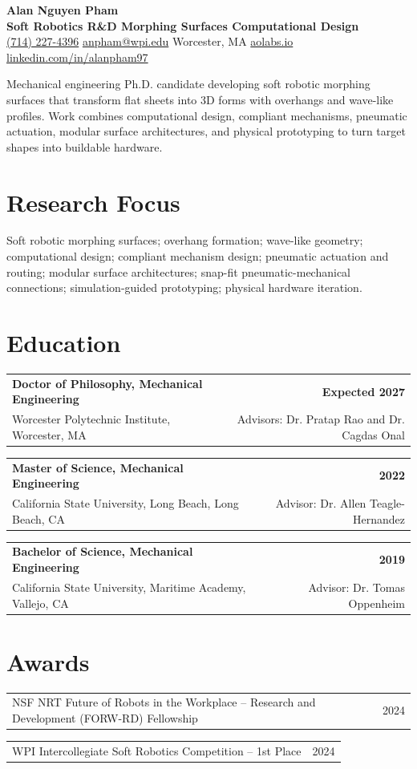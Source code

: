 \documentclass[10pt,letterpaper]{article}
\makeatletter
\newcommand{\contactsep}{\quad\textcolor{muted}{\textbullet}\quad}
\newcommand{\profilebox}[1]{%
  \vspace{5pt}
  {\setlength{\fboxsep}{8pt}\colorbox{peach}{\parbox{\dimexpr\linewidth-2\fboxsep\relax}{#1}}}
  \vspace{1pt}
}
\newcommand{\degreeentry}[4]{%
  \begin{tabularx}{\textwidth}{@{}>{\raggedright\arraybackslash}X r@{}}
    \textbf{#1} & \textbf{#2}\\
    #3 & #4
  \end{tabularx}
  \vspace{0.25pt}
}
\newcommand{\datedline}[2]{%
  \begin{tabularx}{\textwidth}{@{}>{\raggedright\arraybackslash}X r@{}}
    #1 & #2
  \end{tabularx}
}
\makeatother
\begin{document}
\RaggedRight

{\fontsize{22}{25}\selectfont\textbf{Alan Nguyen Pham}}\\[-1pt]
{\large\textbf{\textcolor{accent}{Soft Robotics R\&D \textbar{} Morphing Surfaces \textbar{} Computational Design}}}\\[-1pt]
\href{tel:7142274396}{(714) 227-4396}
\contactsep \href{mailto:anpham@wpi.edu}{anpham@wpi.edu}
\contactsep Worcester, MA
\contactsep \href{https://aolabs.io}{aolabs.io}
\contactsep \href{https://www.linkedin.com/in/alanpham97/}{linkedin.com/in/alanpham97}\\[4pt]
\profilebox{\textcolor{text}{Mechanical engineering Ph.D. candidate developing soft robotic morphing surfaces that transform flat sheets into 3D forms with overhangs and wave-like profiles. Work combines computational design, compliant mechanisms, pneumatic actuation, modular surface architectures, and physical prototyping to turn target shapes into buildable hardware.}}

\section*{Research Focus}
\textcolor{muted}{Soft robotic morphing surfaces; overhang formation; wave-like geometry; computational design; compliant mechanism design; pneumatic actuation and routing; modular surface architectures; snap-fit pneumatic-mechanical connections; simulation-guided prototyping; physical hardware iteration.}

\section*{Education}
\degreeentry{Doctor of Philosophy, Mechanical Engineering}{Expected 2027}{Worcester Polytechnic Institute, Worcester, MA}{Advisors: Dr. Pratap Rao and Dr. Cagdas Onal}
\degreeentry{Master of Science, Mechanical Engineering}{2022}{California State University, Long Beach, Long Beach, CA}{Advisor: Dr. Allen Teagle-Hernandez}
\degreeentry{Bachelor of Science, Mechanical Engineering}{2019}{California State University, Maritime Academy, Vallejo, CA}{Advisor: Dr. Tomas Oppenheim}

\section*{Awards}
\datedline{NSF NRT Future of Robots in the Workplace -- Research and Development (FORW-RD) Fellowship}{2024}
\datedline{WPI Intercollegiate Soft Robotics Competition -- 1st Place}{2024}
\end{document}
